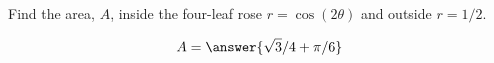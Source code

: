 \documentclass{ximera}
\author{David Guichard \and Neal Koblitz \and H. Jerome Keisler \and Albert Scheller \and Barry Balof \and Mike Wills \and Matthew Carr}
\begin{document}
\begin{exercise}





Find the area, $A$, inside the four-leaf rose $r=\cos(2\theta)$ and outside $r=1/2$.
\begin{prompt}
\[
A=\answer{\sqrt{3}/4+\pi/6}
\]
\end{prompt}



\end{exercise}
\end{document}
